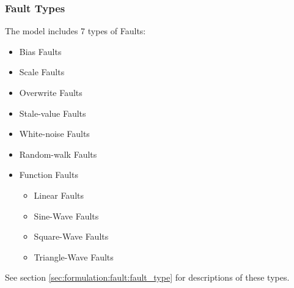 \documentclass[11pt,fleqn]{report}
\begin{document}
\subsubsection{Fault Types}
\par The model includes 7 types of Faults:
\begin{itemize}
  \item Bias Faults
  \item Scale Faults
  \item Overwrite Faults
  \item Stale-value Faults
  \item White-noise Faults
  \item Random-walk Faults
  \item Function Faults \begin{itemize}
    \item Linear Faults
    \item Sine-Wave Faults
    \item Square-Wave Faults
    \item Triangle-Wave Faults
  \end{itemize}
\end{itemize}
See section \ref{sec:formulation:fault:fault_type} for descriptions of these
types.
\end{document}
